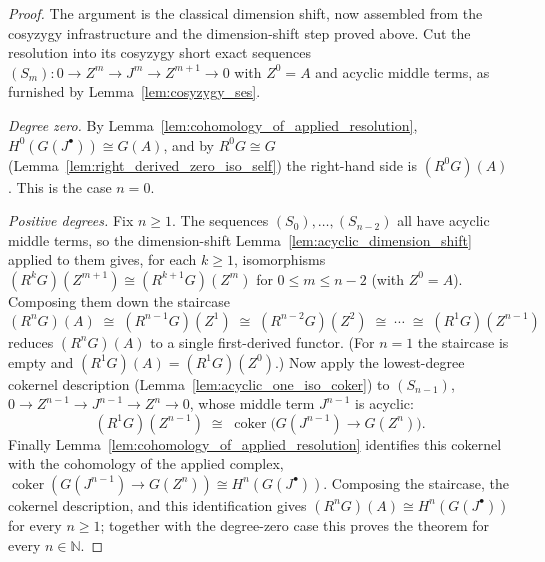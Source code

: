 \begin{proof}
    \leanok
  The argument is the classical dimension shift, now assembled from the cosyzygy
  infrastructure and the dimension-shift step proved above. Cut the resolution into
  its cosyzygy short exact sequences \((S_m) : 0 \to Z^m \to J^m \to Z^{m+1} \to 0\)
  with \(Z^0 = A\) and acyclic middle terms, as furnished by
  Lemma~\ref{lem:cosyzygy_ses}.

  \emph{Degree zero.} By Lemma~\ref{lem:cohomology_of_applied_resolution},
  \(H^0(G(J^\bullet)) \cong G(A)\), and by \(R^0 G \cong G\)
  (Lemma~\ref{lem:right_derived_zero_iso_self}) the right-hand side is \((R^0 G)(A)\).
  This is the case \(n = 0\).

  \emph{Positive degrees.} Fix \(n \geq 1\). The sequences
  \((S_0), \ldots, (S_{n-2})\) all have acyclic middle terms, so the dimension-shift
  Lemma~\ref{lem:acyclic_dimension_shift} applied to them gives, for each \(k \geq 1\),
  isomorphisms \((R^k G)(Z^{m+1}) \cong (R^{k+1} G)(Z^m)\) for \(0 \le m \le n-2\)
  (with \(Z^0 = A\)). Composing them down the staircase
  \[
    (R^n G)(A)
      \;\cong\; (R^{n-1} G)(Z^1)
      \;\cong\; (R^{n-2} G)(Z^2)
      \;\cong\; \cdots
      \;\cong\; (R^{1} G)(Z^{n-1})
  \]
  reduces \((R^n G)(A)\) to a single first-derived functor. (For \(n = 1\) the
  staircase is empty and \((R^1 G)(A) = (R^1 G)(Z^0)\).) Now apply the lowest-degree
  cokernel description (Lemma~\ref{lem:acyclic_one_iso_coker}) to \((S_{n-1})\),
  \(0 \to Z^{n-1} \to J^{n-1} \to Z^n \to 0\), whose middle term \(J^{n-1}\) is
  acyclic:
  \[
    (R^1 G)(Z^{n-1}) \;\cong\; \operatorname{coker}\bigl(G(J^{n-1}) \to G(Z^n)\bigr).
  \]
  Finally Lemma~\ref{lem:cohomology_of_applied_resolution} identifies this cokernel
  with the cohomology of the applied complex,
  \(\operatorname{coker}(G(J^{n-1}) \to G(Z^n)) \cong H^n(G(J^\bullet))\). Composing
  the staircase, the cokernel description, and this identification gives
  \((R^n G)(A) \cong H^n(G(J^\bullet))\) for every \(n \geq 1\); together with the
  degree-zero case this proves the theorem for every \(n \in \mathbb{N}\).


\end{proof}
